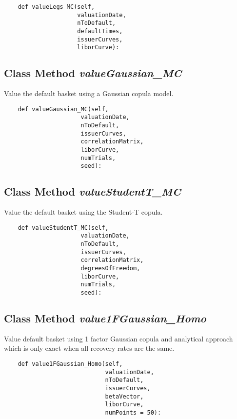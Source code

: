 \documentclass[twoside,11pt]{book}
\begin{document}
\begin{lstlisting}
    def valueLegs_MC(self, 
                     valuationDate,
                     nToDefault,
                     defaultTimes, 
                     issuerCurves,
                     liborCurve):
\end{lstlisting}

\subsection{Class Method {\it valueGaussian\_MC}}
Value the default basket using a Gaussian copula model. 

\begin{lstlisting}
    def valueGaussian_MC(self, 
                      valuationDate,
                      nToDefault,
                      issuerCurves,
                      correlationMatrix,
                      liborCurve,
                      numTrials,
                      seed):
\end{lstlisting}

\subsection{Class Method {\it valueStudentT\_MC}}
Value the default basket using the Student-T copula. 

\begin{lstlisting}
    def valueStudentT_MC(self, 
                      valuationDate,
                      nToDefault,
                      issuerCurves,
                      correlationMatrix,
                      degreesOfFreedom,
                      liborCurve,
                      numTrials,
                      seed):
\end{lstlisting}

\subsection{Class Method {\it value1FGaussian\_Homo}}
Value default basket using 1 factor Gaussian copula and analytical approach which is only exact when all recovery rates are the same. 

\begin{lstlisting}
    def value1FGaussian_Homo(self, 
                             valuationDate,
                             nToDefault,
                             issuerCurves, 
                             betaVector, 
                             liborCurve,
                             numPoints = 50):
\end{lstlisting}
\end{document}
